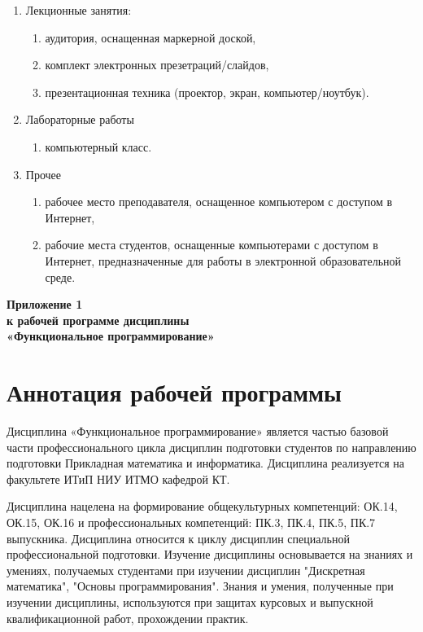 \begin{enumerate}
\item Лекционные занятия:
\begin{enumerate}
\item аудитория, оснащенная маркерной доской, \item комплект электронных презетраций/слайдов, \item презентационная техника (проектор, экран, компьютер/ноутбук).
\end{enumerate}
\item Лабораторные работы
\begin{enumerate}
\item компьютерный класс.
\end{enumerate}
\item Прочее
\begin{enumerate}
\item рабочее место преподавателя, оснащенное компьютером с доступом в Интернет, \item рабочие места студентов, оснащенные компьютерами с доступом в Интернет, предназначенные для работы в электронной образовательной среде.
\end{enumerate}
\end{enumerate}

\newpage
\begin{flushright}
\textbf{Приложение 1\\
к рабочей программе дисциплины\\
«Функциональное программирование»}
\end{flushright}
\section*{Аннотация рабочей программы}

Дисциплина «Функциональное программирование» является частью базовой части профессионального цикла дисциплин подготовки студентов по направлению подготовки Прикладная математика и информатика.
Дисциплина реализуется на факультете ИТиП НИУ ИТМО кафедрой КТ.

Дисциплина нацелена на формирование общекультурных компетенций: ОК.14, ОК.15, ОК.16 и профессиональных компетенций: ПК.3, ПК.4, ПК.5, ПК.7 выпускника. Дисциплина относится к циклу дисциплин специальной профессиональной подготовки. Изучение дисциплины основывается на знаниях и умениях, получаемых студентами при изучении дисциплин "Дискретная математика", "Основы программирования". Знания и умения, полученные при изучении дисциплины, используются при защитах курсовых и выпускной квалификационной работ, прохождении практик.

